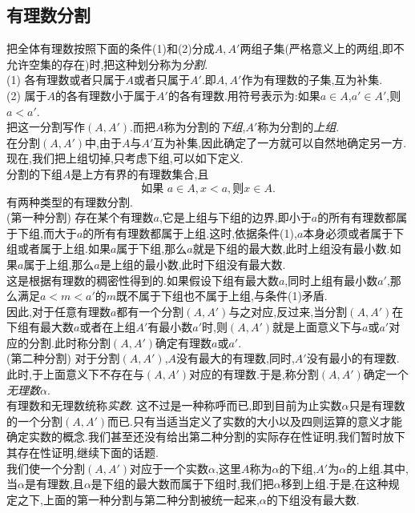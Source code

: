 \documentclass{article}
\begin{document}
\subsection{有理数分割}
把全体有理数按照下面的条件(1)和(2)分成$A,A'$两组子集(严格意义上的两组,即不允许空集的存在)时,把这种划分称为\emph{分割}.\\
(1) 各有理数或者只属于$A$或者只属于$A'$.即$A,A'$作为有理数的子集,互为补集.\\
(2) 属于$A$的各有理数小于属于$A'$的各有理数.用符号表示为:如果$a\in A$,$a'\in A'$,则$a<a'$.\\
把这一分割写作$(A,A')$.而把$A$称为分割的\emph{下组},$A'$称为分割的\emph{上组}.\\
在分割$(A,A')$中,由于$A$与$A'$互为补集,因此确定了一方就可以自然地确定另一方.现在,我们把上组切掉,只考虑下组,可以如下定义.\\
分割的下组$A$是上方有界的有理数集合,且
$$
\text{如果 } a \in A,x < a, \text{则} x \in A.
$$
有两种类型的有理数分割.\\
(第一种分割) 存在某个有理数$a$,它是上组与下组的边界,即小于$a$的所有有理数都属于下组,而大于$a$的所有有理数都属于上组.这时,依据条件(1),$a$本身必须或者属于下组或者属于上组.如果$a$属于下组,那么$a$就是下组的最大数,此时上组没有最小数.如果$a$属于上组,那么$a$是上组的最小数,此时下组没有最大数.\\
这是根据有理数的稠密性得到的.如果假设下组有最大数$a$,同时上组有最小数$a'$,那么满足$a<m<a'$的$m$既不属于下组也不属于上组,与条件(1)矛盾.\\
因此,对于任意有理数$a$都有一个分割$(A,A')$与之对应,反过来,当分割$(A,A')$在下组有最大数$a$或者在上组$A'$有最小数$a'$时,则$(A,A')$就是上面意义下与$a$或$a'$对应的分割.此时称分割$(A,A')$确定有理数$a$或$a'$.\\
(第二种分割) 对于分割$(A,A')$,$A$没有最大的有理数,同时,$A'$没有最小的有理数.此时,于上面意义下不存在与$(A,A')$对应的有理数.于是,称分割$(A,A')$确定一个\emph{无理数}$\alpha$.\\
有理数和无理数统称\emph{实数}.
这不过是一种称呼而已,即到目前为止实数$\alpha$只是有理数的一个分割$(A,A')$而已.只有当适当定义了实数的大小以及四则运算的意义才能确定实数的概念.我们甚至还没有给出第二种分割的实际存在性证明,我们暂时放下其存在性证明,继续下面的话题.\\
我们使一个分割$(A,A')$对应于一个实数$\alpha$,这里$A$称为$\alpha$的下组,$A'$为$\alpha$的上组.其中,当$\alpha$是有理数,且$\alpha$是下组的最大数而属于下组时,我们把$\alpha$移到上组.于是,在这种规定之下,上面的第一种分割与第二种分割被统一起来,$\alpha$的下组没有最大数.
\newpage


\end{document}
